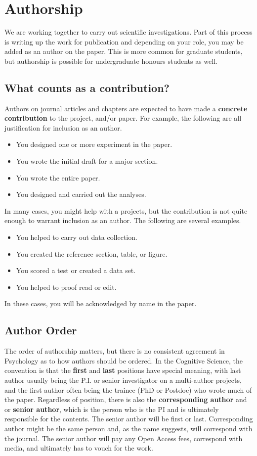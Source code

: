 \documentclass{article}
\begin{document}
\section{Authorship}
We are working together to carry out scientific investigations. Part of this process is writing up the work for publication and depending on your role, you may be added as an author on the paper. This is more common for graduate students, but authorship is possible for undergraduate honours students as well. 

\subsection{What counts as a contribution?}
Authors on journal articles and chapters are expected to have made a \textbf{concrete contribution} to the project, and/or paper. For example, the following are all justification for inclusion as an author.
\begin{itemize}
\item You designed one or more experiment in the paper.
\item You wrote the initial draft for a major section.
\item You wrote the entire paper.
\item You designed and carried out the analyses.
\end{itemize}

In many cases, you might help with a projects, but the contribution is not quite enough to warrant inclusion as an author. The following are several examples.
\begin{itemize}
\item You helped to carry out data collection.
\item You created the reference section, table, or figure.
\item You scored a test or created a data set.
\item You helped to proof read or edit.
\end{itemize}
In these cases, you will be acknowledged by name in the paper.

\subsection{Author Order} The order of authorship matters, but there is no consistent agreement in Psychology as to how authors should be ordered. In the Cognitive Science, the convention is that the \textbf{first} and \textbf{last} positions have special meaning, with last author usually being the P.I. or senior investigator on a multi-author projects, and the first author often being the trainee (PhD or Postdoc) who wrote much of the paper. Regardless of position, there is also the \textbf{corresponding author} and or \textbf{senior author}, which is the person who is the PI and is ultimately responsible for the contents. The senior author will be first or last. Corresponding author might be the same person and, as the name suggests, will correspond with the journal. The senior author will pay any Open Access fees, correspond with media, and ultimately has to vouch for the work. 
\end{document}
